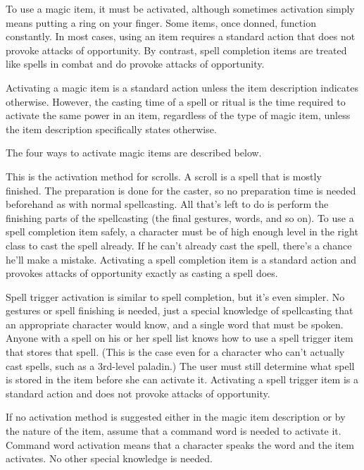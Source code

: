 To use a magic item, it must be activated, although sometimes activation simply means putting a ring on your finger. Some items, once donned, function constantly. In most cases, using an item requires a standard action that does not provoke attacks of opportunity. By contrast, spell completion items are treated like spells in combat and do provoke attacks of opportunity.

Activating a magic item is a standard action unless the item description indicates otherwise. However, the casting time of a spell or ritual is the time required to activate the same power in an item, regardless of the type of magic item, unless the item description specifically states otherwise.

The four ways to activate magic items are described below.

 This is the activation method for scrolls. A scroll is a spell that is mostly finished. The preparation is done for the caster, so no preparation time is needed beforehand as with normal spellcasting. All that's left to do is perform the finishing parts of the spellcasting (the final gestures, words, and so on). To use a spell completion item safely, a character must be of high enough level in the right class to cast the spell already. If he can't already cast the spell, there's a chance he'll make a mistake. Activating a spell completion item is a standard action and provokes attacks of opportunity exactly as casting a spell does.

 Spell trigger activation is similar to spell completion, but it's even simpler. No gestures or spell finishing is needed, just a special knowledge of spellcasting that an appropriate character would know, and a single word that must be spoken. Anyone with a spell on his or her spell list knows how to use a spell trigger item that stores that spell. (This is the case even for a character who can't actually cast spells, such as a 3rd-level paladin.) The user must still determine what spell is stored in the item before she can activate it. Activating a spell trigger item is a standard action and does not provoke attacks of opportunity.

 If no activation method is suggested either in the magic item description or by the nature of the item, assume that a command word is needed to activate it. Command word activation means that a character speaks the word and the item activates. No other special knowledge is needed.

